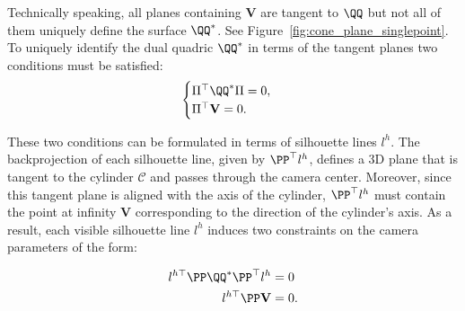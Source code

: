 Technically speaking, all planes containing $\mathbf{V}$ are tangent to $\QQ$ but not all of them uniquely define the surface $\QQ^*$. See Figure~\ref{fig:cone_plane_singlepoint}.
To uniquely identify the dual quadric $\QQ^*$ in terms of the tangent planes two conditions must be satisfied:
\begin{equation}
	\begin{cases}
		\Pi^\top \QQ^* \Pi = 0, \\
		\Pi^\top \mathbf{V} = 0.
	\end{cases}
\end{equation}

These two conditions can be formulated in terms of silhouette lines $l^h$. The backprojection of each silhouette line, given by $\PP^\top l^h$, defines a 3D plane that is tangent to the cylinder $\mathcal{C}$ and passes through the camera center. Moreover, since this tangent plane is  aligned with the axis of the cylinder, $\PP^\top l^h$ must contain the point at infinity $\mathbf{V}$ corresponding to the direction of the cylinder's axis. 
As a result, each visible silhouette line $l^h$ induces two constraints on the camera parameters of the form:

\begin{align}
	l^{h \top} \PP \QQ^* \PP^\top l^h & = 0 \label{eq:dual_quadric_constraint} \\
	l^{h \top} \PP \mathbf{V}         & = 0.\label{eq:vertex_constraint}
\end{align}

